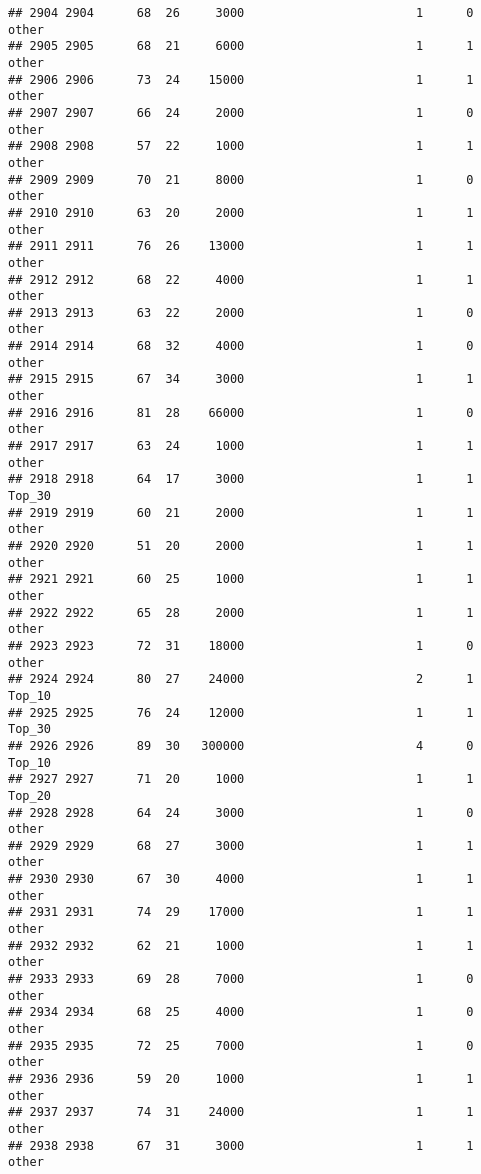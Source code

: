 \documentclass[
]{article}
\begin{document}
\begin{verbatim}
## 2904 2904      68  26     3000                        1      0    other
## 2905 2905      68  21     6000                        1      1    other
## 2906 2906      73  24    15000                        1      1    other
## 2907 2907      66  24     2000                        1      0    other
## 2908 2908      57  22     1000                        1      1    other
## 2909 2909      70  21     8000                        1      0    other
## 2910 2910      63  20     2000                        1      1    other
## 2911 2911      76  26    13000                        1      1    other
## 2912 2912      68  22     4000                        1      1    other
## 2913 2913      63  22     2000                        1      0    other
## 2914 2914      68  32     4000                        1      0    other
## 2915 2915      67  34     3000                        1      1    other
## 2916 2916      81  28    66000                        1      0    other
## 2917 2917      63  24     1000                        1      1    other
## 2918 2918      64  17     3000                        1      1   Top_30
## 2919 2919      60  21     2000                        1      1    other
## 2920 2920      51  20     2000                        1      1    other
## 2921 2921      60  25     1000                        1      1    other
## 2922 2922      65  28     2000                        1      1    other
## 2923 2923      72  31    18000                        1      0    other
## 2924 2924      80  27    24000                        2      1   Top_10
## 2925 2925      76  24    12000                        1      1   Top_30
## 2926 2926      89  30   300000                        4      0   Top_10
## 2927 2927      71  20     1000                        1      1   Top_20
## 2928 2928      64  24     3000                        1      0    other
## 2929 2929      68  27     3000                        1      1    other
## 2930 2930      67  30     4000                        1      1    other
## 2931 2931      74  29    17000                        1      1    other
## 2932 2932      62  21     1000                        1      1    other
## 2933 2933      69  28     7000                        1      0    other
## 2934 2934      68  25     4000                        1      0    other
## 2935 2935      72  25     7000                        1      0    other
## 2936 2936      59  20     1000                        1      1    other
## 2937 2937      74  31    24000                        1      1    other
## 2938 2938      67  31     3000                        1      1    other

\end{verbatim}
\end{document}
